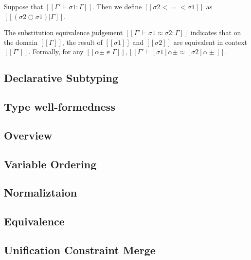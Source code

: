 \documentclass[a4,natbib=false]{article}
\begin{document}
\begin{definition}
  Suppose that $[[Γ' ⊢ σ1 : Γ]]$.
  Then we define $[[σ2 <=< σ1]]$ as $[[(σ2 ○ σ1)|{Γ}]]$.
\end{definition}

\begin{definition}
  The substitution equivalence judgement $[[Γ' ⊢ σ1 ≈ σ2 : Γ]]$ 
  indicates that on the domain $[[Γ]]$, 
  the result of $[[σ1]]$ and $[[σ2]]$ are equivalent in context $[[Γ']]$.
  Formally, for any $[[α± ∊ {Γ}]], [[ Γ' ⊢ [σ1]α± ≈ [σ2]α± ]]$.
\end{definition}




\subsection{Declarative Subtyping}


\subsection{Type well-formedness}


\subsection{Overview}


\subsection{Variable Ordering}


\subsection{Normaliztaion}


\subsection{Equivalence}


\subsection{Unification Constraint Merge}

\end{document}
